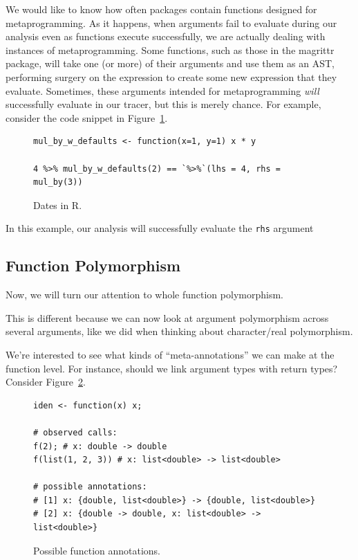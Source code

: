 \documentclass[acmsmall,10pt,review,anonymous]{acmart}\settopmatter{printfolios=true,printccs=false,printacmref=false}
\begin{document}
We would like to know how often packages contain functions designed for metaprogramming.
As it happens, when arguments fail to evaluate during our analysis even as functions execute successfully, we are actually dealing with instances of metaprogramming.
Some functions, such as those in the magrittr package, will take one (or more) of their arguments and use them as an AST, performing surgery on the expression to create some new expression that they evaluate.
Sometimes, these arguments intended for metaprogramming {\it will} successfully evaluate in our tracer, but this is merely chance.
For example, consider the code snippet in Figure~\ref{fig:metaexworks}.

\begin{figure}[!hb]{\small\begin{lstlisting}[style=R]
mul_by_w_defaults <- function(x=1, y=1) x * y

4 %>% mul_by_w_defaults(2) == `%>%`(lhs = 4, rhs = mul_by(3)) 
\end{lstlisting}}\caption{Dates in R.}\label{fig:metaexworks}\end{figure}

In this example, our analysis will successfully evaluate the {\tt rhs} argument 

%
%
%
%
\subsection{Function Polymorphism}

Now, we will turn our attention to whole function polymorphism.

This is different because we can now look at argument polymorphism across several arguments, like we did when thinking about character/real polymorphism.

We're interested to see what kinds of ``meta-annotations'' we can make at the function level.
For instance, should we link argument types with return types?
Consider Figure~\ref{fig:funanno}.
\begin{figure}[!hb]{\small\begin{lstlisting}[style=R]
iden <- function(x) x;

# observed calls:
f(2); # x: double -> double
f(list(1, 2, 3)) # x: list<double> -> list<double>

# possible annotations:
# [1] x: {double, list<double>} -> {double, list<double>}
# [2] x: {double -> double, x: list<double> -> list<double>}
\end{lstlisting}}\caption{Possible function annotations.}\label{fig:funanno}\end{figure}
\end{document}
